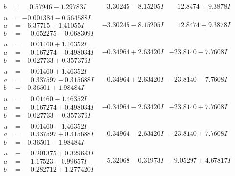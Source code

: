 \documentclass[1p]{elsarticle_modified}
\theoremstyle{definition}
\begin{document}
$$\begin{array}{c|c|c}
\begin{aligned}
b &= \phantom{-}0.57946 - 1.29783 I\end{aligned}
 & -3.30245 - 8.15205 I & \phantom{-}12.8474 + 9.3878 I \\ \hline\begin{aligned}
u &= -0.001384 - 0.564588 I \\
a &= -6.37715 - 1.41055 I \\
b &= \phantom{-}0.652275 - 0.068309 I\end{aligned}
 & -3.30245 - 8.15205 I & \phantom{-}12.8474 + 9.3878 I \\ \hline\begin{aligned}
u &= \phantom{-}0.01460 + 1.46352 I \\
a &= \phantom{-}0.167274 - 0.498034 I \\
b &= -0.027733 + 0.357376 I\end{aligned}
 & -0.34964 + 2.63420 I & -23.8140 - 7.7608 I \\ \hline\begin{aligned}
u &= \phantom{-}0.01460 + 1.46352 I \\
a &= \phantom{-}0.337597 - 0.315688 I \\
b &= -0.36501 + 1.98484 I\end{aligned}
 & -0.34964 + 2.63420 I & -23.8140 - 7.7608 I \\ \hline\begin{aligned}
u &= \phantom{-}0.01460 - 1.46352 I \\
a &= \phantom{-}0.167274 + 0.498034 I \\
b &= -0.027733 - 0.357376 I\end{aligned}
 & -0.34964 - 2.63420 I & -23.8140 + 7.7608 I \\ \hline\begin{aligned}
u &= \phantom{-}0.01460 - 1.46352 I \\
a &= \phantom{-}0.337597 + 0.315688 I \\
b &= -0.36501 - 1.98484 I\end{aligned}
 & -0.34964 - 2.63420 I & -23.8140 + 7.7608 I \\ \hline\begin{aligned}
u &= \phantom{-}0.201375 + 0.329683 I \\
a &= \phantom{-}1.17523 - 0.99657 I \\
b &= \phantom{-}0.282712 + 1.277420 I\end{aligned}
 & -5.32068 - 0.31973 I & -9.05297 + 4.67817 I \\ \hline\begin{aligned}

\end{aligned}
\end{array}$$
\end{document}
